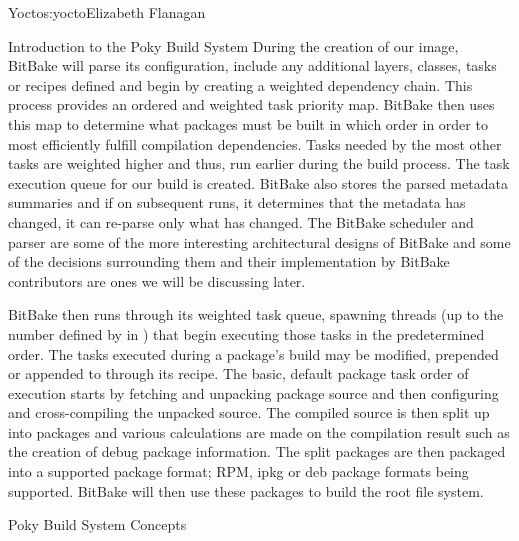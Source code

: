\begin{aosachapter}{Yocto}{s:yocto}{Elizabeth Flanagan}
\begin{aosasect1}{Introduction to the Poky Build System}
During the creation of our image, BitBake will parse its
configuration, include any additional layers, classes, tasks or
recipes defined and begin by creating a weighted dependency
chain. This process provides an ordered and weighted task priority
map. BitBake then uses this map to determine what packages must be
built in which order in order to most efficiently fulfill compilation
dependencies. Tasks needed by the most other tasks are weighted higher
and thus, run earlier during the build process. The task execution
queue for our build is created. BitBake also stores the parsed
metadata summaries and if on subsequent runs, it determines that the
metadata has changed, it can re-parse only what has changed. The
BitBake scheduler and parser are some of the more interesting
architectural designs of BitBake and some of the decisions surrounding
them and their implementation by BitBake contributors are ones we will
be discussing later.


BitBake then runs through its weighted task queue, spawning threads
(up to the number defined by  in
) that begin executing those tasks in the
predetermined order. The tasks executed during a package's build may
be modified, prepended or appended to through its recipe. The basic,
default package task order of execution starts by fetching and
unpacking package source and then configuring and cross-compiling the
unpacked source. The compiled source is then split up into packages
and various calculations are made on the compilation result such as
the creation of debug package information.  The split packages are
then packaged into a supported package format; RPM, ipkg or deb package
formats being supported. BitBake will then use these packages to build
the root file system.


\begin{aosasect2}{Poky Build System Concepts}


\end{aosasect2}
\end{aosasect1}
\end{aosachapter}
